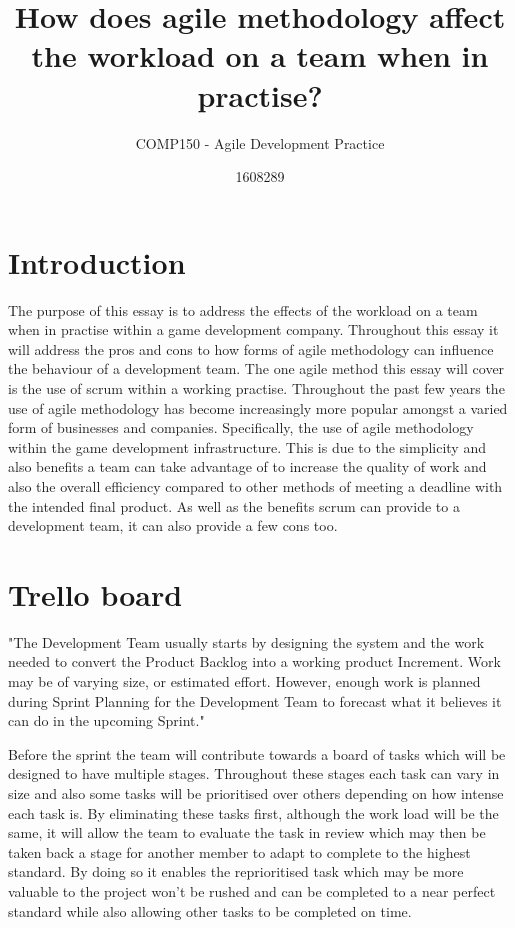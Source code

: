 \documentclass{scrartcl}
\title{How does agile methodology affect the workload on a team when in practise?}
\subtitle{COMP150 - Agile Development Practice}
\author{1608289}
\begin{document}
\maketitle


\section{Introduction}
The purpose of this essay is to address the effects of the workload on a team when in practise within a game development company. Throughout this essay it will address the pros and cons to how forms of agile methodology can influence the behaviour of a development team. The one agile method this essay will cover is the use of scrum within a working practise. Throughout the past few years the use of agile methodology has become increasingly more popular amongst a varied form of businesses and companies. Specifically, the use of agile methodology within the game development infrastructure. This is due to the simplicity and also benefits a team can take advantage of to increase the quality of work and also the overall efficiency compared to other methods of meeting a deadline with the intended final product. As well as the benefits scrum can provide to a development team, it can also provide a few cons too. 

\section{Trello board}
"The Development Team usually starts by designing the system and the work needed to convert the Product Backlog into a working product Increment. Work may be of varying size, or estimated effort. However, enough work is planned during Sprint Planning for the Development Team to forecast what it believes it can do in the upcoming Sprint." \cite{scrumalliance}

Before the sprint the team will contribute towards a board of tasks which will be designed to have multiple stages. Throughout these stages each task can vary in size and also some tasks will be prioritised over others depending on how intense each task is. By eliminating these tasks first, although the work load will be the same, it will allow the team to evaluate the task in review which may then be taken back a stage for another member to adapt to complete to the highest standard. By doing so it enables the reprioritised task which may be more valuable to the project won’t be rushed and can be completed to a near perfect standard while also allowing other tasks to be completed on time.
\end{document}
